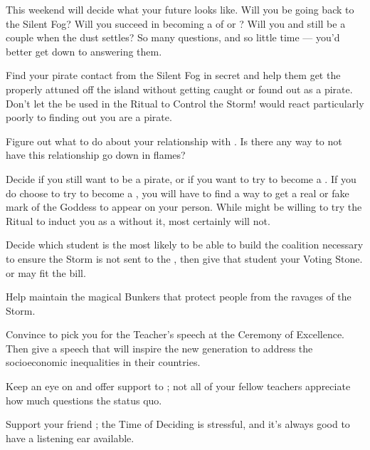 \documentclass[char]{GL2020}
\begin{document}
This weekend will decide what your future looks like. Will you be going back to the Silent Fog? Will you succeed in becoming a \cPirate{\cleric} of \cEbb{} or \cFlow{}? Will you and \cPrince{} still be a couple when the dust settles? So many questions, and so little time — you'd better get down to answering them.

\begin{itemz}
    \item Find your pirate contact from the Silent Fog in secret and help them get the properly attuned \iNet{} off the island without getting caught or found out as a pirate. Don't let the \iNet{} be used in the Ritual to Control the Storm! \cPrincipal{} would react particularly poorly to finding out you are a pirate.
    \item Figure out what to do about your relationship with \cPrince{}. Is there any way to not have this relationship go down in flames?
    \item Decide if you still want to be a pirate, or if you want to try to become a \cPirate{\cleric}. If you do choose to try to become a \cPirate{\cleric}, you will have to find a way to get a real or fake mark of the Goddess to appear on your person. While \cFlowPriest{} might be willing to try the Ritual to induct you as a \cPirate{\cleric} without it, \cEbbPriest{} most certainly will not.
     \item Decide which \pShippie{} student is the most likely to be able to build the coalition necessary to ensure the Storm is not sent to the \pShip{}, then give that student your Voting Stone. \cWarlordDaughter{} or \cPresident{} may fit the bill.
\end{itemz}

\begin{itemz}
    \item Help \cBunker{} maintain the magical Bunkers that protect people from the ravages of the Storm.
    \item Convince \cMusic{} to pick you for the Teacher's speech at the Ceremony of Excellence. Then give a speech that will inspire the new generation to address the socioeconomic inequalities in their countries.
    \item Keep an eye on and offer support to \cPirateChild{}; not all of your fellow teachers appreciate how much \cPirateChild{} questions the status quo.
    \item Support your friend \cEthics{}; the Time of Deciding is stressful, and it’s always good to have a listening ear available.
\end{itemz}
\end{document}

